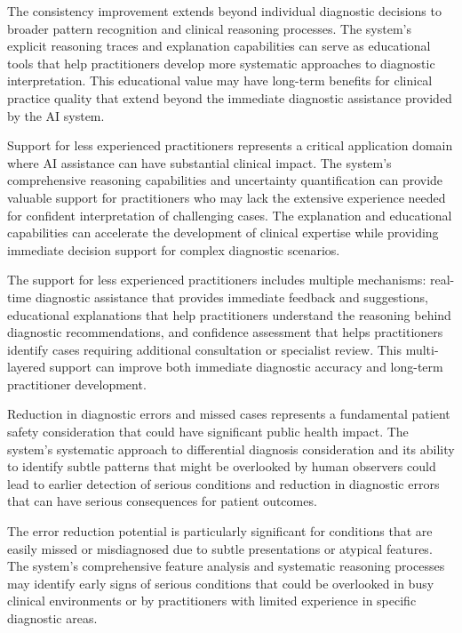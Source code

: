 The consistency improvement extends beyond individual diagnostic decisions to broader pattern recognition and clinical reasoning processes. The system's explicit reasoning traces and explanation capabilities can serve as educational tools that help practitioners develop more systematic approaches to diagnostic interpretation. This educational value may have long-term benefits for clinical practice quality that extend beyond the immediate diagnostic assistance provided by the AI system.

Support for less experienced practitioners represents a critical application domain where AI assistance can have substantial clinical impact. The system's comprehensive reasoning capabilities and uncertainty quantification can provide valuable support for practitioners who may lack the extensive experience needed for confident interpretation of challenging cases. The explanation and educational capabilities can accelerate the development of clinical expertise while providing immediate decision support for complex diagnostic scenarios.

The support for less experienced practitioners includes multiple mechanisms: real-time diagnostic assistance that provides immediate feedback and suggestions, educational explanations that help practitioners understand the reasoning behind diagnostic recommendations, and confidence assessment that helps practitioners identify cases requiring additional consultation or specialist review. This multi-layered support can improve both immediate diagnostic accuracy and long-term practitioner development.

Reduction in diagnostic errors and missed cases represents a fundamental patient safety consideration that could have significant public health impact. The system's systematic approach to differential diagnosis consideration and its ability to identify subtle patterns that might be overlooked by human observers could lead to earlier detection of serious conditions and reduction in diagnostic errors that can have serious consequences for patient outcomes.

The error reduction potential is particularly significant for conditions that are easily missed or misdiagnosed due to subtle presentations or atypical features. The system's comprehensive feature analysis and systematic reasoning processes may identify early signs of serious conditions that could be overlooked in busy clinical environments or by practitioners with limited experience in specific diagnostic areas.

